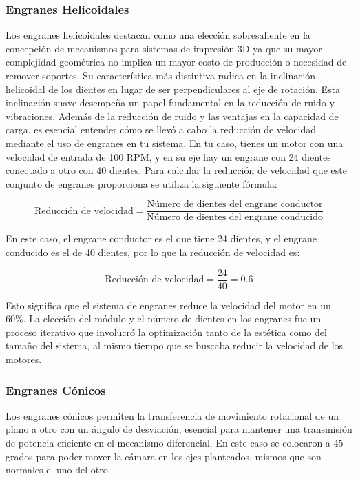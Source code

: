     \subsubsection{Engranes Helicoidales}
    Los engranes helicoidales destacan como una elección sobresaliente en la concepción de mecanismos para sistemas de impresión 3D ya que su mayor complejidad geométrica no implica un mayor costo de producción o necesidad de remover soportes. Su característica más distintiva radica en la inclinación helicoidal de los dientes en lugar de ser perpendiculares al eje de rotación. Esta inclinación suave desempeña un papel fundamental en la reducción de ruido y vibraciones.
    Además de la reducción de ruido y las ventajas en la capacidad de carga, es esencial entender cómo se llevó a cabo la reducción de velocidad mediante el uso de engranes en tu sistema. En tu caso, tienes un motor con una velocidad de entrada de 100 RPM, y en su eje hay un engrane con 24 dientes conectado a otro con 40 dientes. Para calcular la reducción de velocidad que este conjunto de engranes proporciona se utiliza la siguiente fórmula:

    \begin{equation}
    \text{Reducción de velocidad} = \frac{\text{Número de dientes del engrane conductor}}{\text{Número de dientes del engrane conducido}}
    \end{equation}
    
    En este caso, el engrane conductor es el que tiene 24 dientes, y el engrane conducido es el de 40 dientes, por lo que la reducción de velocidad es:
    
    \begin{equation*}
    \text{Reducción de velocidad} = \frac{24}{40} = 0.6
    \end{equation*}
    
    Esto significa que el sistema de engranes reduce la velocidad del motor en un 60\%.
    La elección del módulo y el número de dientes en los engranes fue un proceso iterativo que involucró la optimización tanto de la estética como del tamaño del sistema, al mismo tiempo que se buscaba reducir la velocidad de los motores.
    
    \subsubsection{Engranes Cónicos}
    Los engranes cónicos permiten la transferencia de movimiento rotacional de un plano a otro con un ángulo de desviación, esencial para mantener una transmisión de potencia eficiente en el mecanismo diferencial. En este caso se colocaron a 45 grados para poder mover la cámara en los ejes planteados, mismos que son normales el uno del otro.


